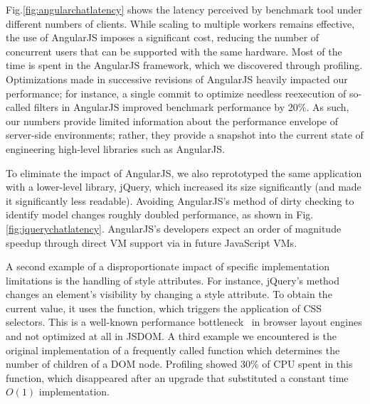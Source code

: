 Fig.\ref{fig:angularchatlatency} shows the latency perceived by benchmark tool
under different numbers of clients. While scaling to multiple workers remains effective,
the use of AngularJS imposes a significant cost, reducing the number of concurrent users 
that can be supported with the same hardware.  Most of the time is spent in the AngularJS
framework, which we discovered through profiling.  Optimizations made in successive revisions
of AngularJS heavily impacted our performance; for instance, a single commit to optimize
needless reexecution of so-called filters in AngularJS improved benchmark performance by 20\%.
As such, our numbers provide limited information about the performance envelope of
server-side environments; rather, they provide a snapshot into the current state of
engineering high-level libraries such as AngularJS.  

\jquerychatlatency{}
To eliminate the impact of AngularJS, we also reprototyped the same application with a
lower-level library, jQuery, which increased its size significantly (and made it significantly
less readable).  Avoiding AngularJS's method of dirty checking to identify model changes
roughly doubled performance, as shown in Fig.\ref{fig:jquerychatlatency}.
AngularJS's developers expect an order of magnitude speedup through direct VM 
support via  in future JavaScript VMs\cite{angularjsspeedup}.

A second example of a disproportionate impact of specific implementation limitations
is the handling of style attributes.  For instance, jQuery's  method changes an element's
visibility by changing a style attribute.  To obtain the current value, it uses the
 function, which triggers the application of CSS selectors.
This is a well-known performance bottleneck~\cite{Meyerovich+:WWW2010} in browser
layout engines and not optimized at all in JSDOM.  A third example we encountered 
is the original implementation of a frequently called function 
which determines the number of children of a DOM node.  Profiling showed 30\% of CPU
spent in this function, which disappeared after an upgrade that substituted a
constant time $O(1)$ implementation.

